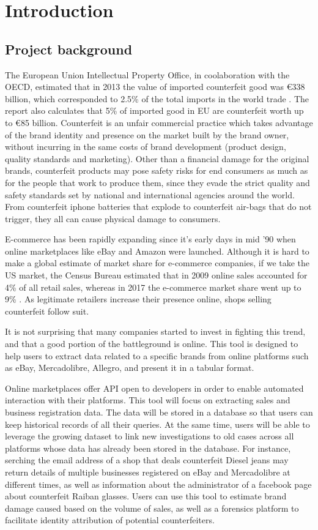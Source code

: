 \chapter{Introduction}

\section{Project background}
The European Union Intellectual Property Office, in coolaboration with the
OECD, estimated that in 2013 the value of imported counterfeit good was
\euro338 billion, which corresponded to 2.5\% of the total imports in the world
trade \cite{OE16}. The report also calculates that 5\% of imported good in EU
are counterfeit worth up to \euro85 billion. Counterfeit is an unfair commercial
practice which takes advantage of the brand identity and presence on the market built by the brand
owner, without incurring in the same costs of brand development (product design,
quality standards and marketing). Other than a financial damage for the original
brands, counterfeit products may pose safety risks for end consumers as much as
for the people that work to produce them, since they evade the strict quality
and safety standards set by national and international agencies around the
world. From counterfeit iphone batteries that explode to counterfeit air-bags
that do not trigger, they all can cause physical damage to consumers.

E-commerce has been rapidly expanding since it's early days in mid '90 when
online marketplaces like eBay and Amazon were launched. Although it is hard to
make a global estimate of market share for e-commerce companies, if we take the
US market, the Census Bureau estimated that in 2009 online sales accounted for
4\% of all retail sales, whereas in 2017 the e-commerce market share went up to
9\% \cite{USDC18}. As legitimate retailers increase their presence online,
shops selling counterfeit follow suit.

It is not surprising that many companies started to invest in fighting this
trend, and that a good portion of the battleground is online. This tool is
designed to help users to extract data related to a specific brands from online
platforms such as eBay, Mercadolibre, Allegro, and present it in a tabular
format.

Online marketplaces offer API open to developers in order to enable automated
interaction with their platforms. This tool will focus on extracting sales and
business registration data. The data will be stored in a database so that users
can keep historical records of all their queries. At the same time, users will
be able to leverage the growing dataset to link new investigations to old cases
across all platforms whose data has already been stored in the database. For
instance, serching the email address of a shop that deals counterfeit Diesel
jeans may return details of multiple businesses registered on eBay and
Mercadolibre at different times, as well as information about the administrator
of a facebook page about counterfeit Raiban glasses. Users can use this tool to
estimate brand damage caused based on the volume of sales, as well as a
forensics platform to facilitate identity attribution of potential
counterfeiters.

